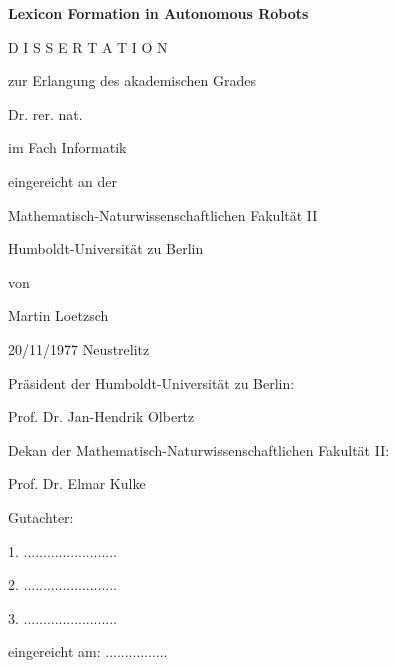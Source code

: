 


\centerline{\bfseries\sffamily\huge Lexicon Formation in Autonomous Robots}

\vspace{2cm}

\large 
\centerline{D I S S E R T A T I O N}

\vspace{0.3cm}

\centerline{zur Erlangung des akademischen Grades}

\vspace{0.3cm}

\centerline{Dr. rer. nat.}
\centerline{im Fach Informatik}

\vspace{1cm}

\centerline{eingereicht an der}

\vspace{0.3cm}

\centerline{Mathematisch-Naturwissenschaftlichen Fakultät II}
\centerline{Humboldt-Universität zu Berlin}

\vspace{1cm}

\centerline{von}
\centerline{\sffamily Martin Loetzsch}
\centerline{20/11/1977 Neustrelitz}


\vspace{1.5cm}

Präsident der Humboldt-Universität zu Berlin:

Prof. Dr. Jan-Hendrik Olbertz

\vspace{0.5cm}

Dekan der Mathematisch-Naturwissenschaftlichen Fakultät II:

Prof. Dr. Elmar Kulke

\vspace{0.5cm}


Gutachter:

1. ........................

2. ........................

3. ........................

\vspace{0.5cm}

eingereicht am: ................

\normalsize

\cleardoublepage

